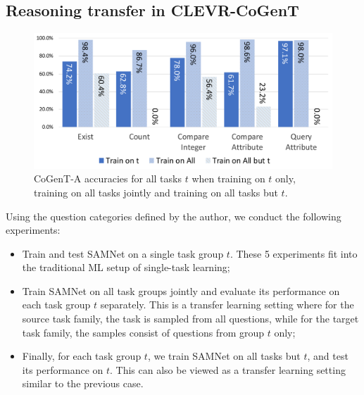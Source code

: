 

\subsection{Reasoning transfer in CLEVR-CoGenT}
\label{sec:reasoning-clevr}

\begin{figure}[htbp]
	\centering
	\includegraphics[width=\columnwidth]{../img/plots/cogent_reasoning_transfer.pdf}
	\caption{CoGenT-A accuracies for all tasks $t$ when training on $t$ only, training on all tasks jointly and training on all tasks but $t$.}
	\label{fig:CoGenT-results}
\end{figure}

Using the question categories defined by the author, we conduct the following experiments:
\begin{itemize}
	\compresslist
	\item Train and test SAMNet on a single task group $t$. These 5 experiments fit into the traditional ML setup of single-task learning;
	\item Train SAMNet on all task groups jointly and evaluate its performance on each task group $t$ separately.
	This is a transfer learning setting where for the source task family, the task is sampled from all questions, while for the target task family, the samples consist of questions from group $t$ only;
	\item Finally, for each task group $t$, we train SAMNet on all tasks but $t$, and test its performance on $t$. This can also be viewed as a transfer learning setting similar to the previous case.
\end{itemize}

